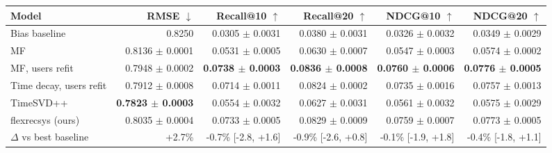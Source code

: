 \begin{tabular}{lrrrrr}
\toprule
Model & RMSE $\downarrow$ & Recall@10 $\uparrow$ & Recall@20 $\uparrow$ & NDCG@10 $\uparrow$ & NDCG@20 $\uparrow$ \\
\midrule
Bias baseline & 0.8250 & 0.0305 $\pm$ 0.0031 & 0.0380 $\pm$ 0.0031 & 0.0326 $\pm$ 0.0032 & 0.0349 $\pm$ 0.0029 \\
MF & 0.8136 $\pm$ 0.0001 & 0.0531 $\pm$ 0.0005 & 0.0630 $\pm$ 0.0007 & 0.0547 $\pm$ 0.0003 & 0.0574 $\pm$ 0.0002 \\
MF, users refit & 0.7948 $\pm$ 0.0002 & \textbf{0.0738 $\pm$ 0.0003} & \textbf{0.0836 $\pm$ 0.0008} & \textbf{0.0760 $\pm$ 0.0006} & \textbf{0.0776 $\pm$ 0.0005} \\
Time decay, users refit & 0.7912 $\pm$ 0.0008 & 0.0714 $\pm$ 0.0011 & 0.0824 $\pm$ 0.0002 & 0.0735 $\pm$ 0.0016 & 0.0757 $\pm$ 0.0013 \\
TimeSVD++ & \textbf{0.7823 $\pm$ 0.0003} & 0.0554 $\pm$ 0.0032 & 0.0627 $\pm$ 0.0031 & 0.0561 $\pm$ 0.0032 & 0.0575 $\pm$ 0.0029 \\
flexrecsys (ours) & 0.8035 $\pm$ 0.0004 & 0.0733 $\pm$ 0.0005 & 0.0829 $\pm$ 0.0009 & 0.0759 $\pm$ 0.0007 & 0.0773 $\pm$ 0.0005 \\
\midrule
$\Delta$ vs best baseline & +2.7\% & -0.7\% [-2.8, +1.6] & -0.9\% [-2.6, +0.8] & -0.1\% [-1.9, +1.8] & -0.4\% [-1.8, +1.1] \\
\bottomrule
\end{tabular}
